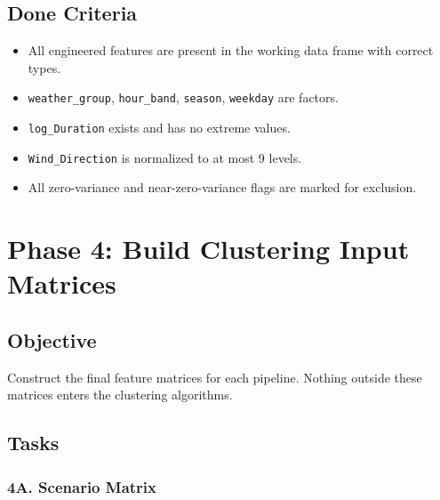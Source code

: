 \documentclass[11pt]{article}
\begin{document}
\subsection{Done Criteria}

\begin{itemize}
  \item All engineered features are present in the working data frame with correct types.
  \item \texttt{weather\_group}, \texttt{hour\_band}, \texttt{season}, \texttt{weekday} are factors.
  \item \texttt{log\_Duration} exists and has no extreme values.
  \item \texttt{Wind\_Direction} is normalized to at most 9 levels.
  \item All zero-variance and near-zero-variance flags are marked for exclusion.
\end{itemize}

\newpage
\section{Phase 4: Build Clustering Input Matrices}

\subsection{Objective}

Construct the final feature matrices for each pipeline. Nothing outside these matrices enters the clustering algorithms.

\subsection{Tasks}

\subsubsection*{4A. Scenario Matrix}
\end{document}
